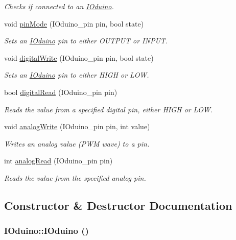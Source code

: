 \begin{DoxyCompactItemize}
\begin{DoxyCompactList}\small\item\em Checks if connected to an \hyperlink{classIOduino}{IOduino}. \item\end{DoxyCompactList}\item 
void \hyperlink{classIOduino_a93d15fb0da35a535f8010c1123be2c2c}{pinMode} (IOduino\_\-pin pin, bool state)
\begin{DoxyCompactList}\small\item\em Sets an \hyperlink{classIOduino}{IOduino} pin to either OUTPUT or INPUT. \item\end{DoxyCompactList}\item 
void \hyperlink{classIOduino_ab24475bba0e8ddea4257a561a3b21263}{digitalWrite} (IOduino\_\-pin pin, bool state)
\begin{DoxyCompactList}\small\item\em Sets an \hyperlink{classIOduino}{IOduino} pin to either HIGH or LOW. \item\end{DoxyCompactList}\item 
bool \hyperlink{classIOduino_afb5c2f8e8ac382964debda0b4a86cd00}{digitalRead} (IOduino\_\-pin pin)
\begin{DoxyCompactList}\small\item\em Reads the value from a specified digital pin, either HIGH or LOW. \item\end{DoxyCompactList}\item 
void \hyperlink{classIOduino_a8fc8b7253bb8c4e7a339997221ce3522}{analogWrite} (IOduino\_\-pin pin, int value)
\begin{DoxyCompactList}\small\item\em Writes an analog value (PWM wave) to a pin. \item\end{DoxyCompactList}\item 
int \hyperlink{classIOduino_a6dc01079f940a16884f4fd0cc29f8406}{analogRead} (IOduino\_\-pin pin)
\begin{DoxyCompactList}\small\item\em Reads the value from the specified analog pin. \item\end{DoxyCompactList}\end{DoxyCompactItemize}


\subsection{Constructor \& Destructor Documentation}
\hypertarget{classIOduino_ab4ccbd526cd336d5c5fc53f361ef3dd2}{
\subsubsection[{IOduino}]{\setlength{\rightskip}{0pt plus 5cm}IOduino::IOduino ()}}
\label{classIOduino_ab4ccbd526cd336d5c5fc53f361ef3dd2}


